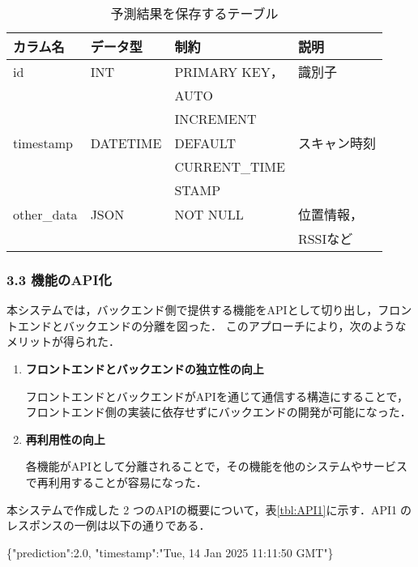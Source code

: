 \begin{table}[tb]
	\centering
	\caption{予測結果を保存するテーブル}
	\label{tbl:prediction_table}
	\small
	\setlength{\tabcolsep}{4pt}
	\doublerulesep=0.3pt
	\begin{tabular}{l|l|l|l} \hline\hline\hline
		カラム名 & データ型 & 制約 & 説明 \\ \hline
		id & INT & PRIMARY KEY， &  識別子 \\
		&&AUTO& \\
		&&INCREMENT& \\ \hline
		timestamp & DATETIME & DEFAULT  & スキャン時刻 \\
		&&CURRENT\_TIME& \\
		&&STAMP& \\ \hline
		other\_data & JSON & NOT NULL & 位置情報，\\
		&&&RSSIなど \\ \hline\hline\hline
	\end{tabular}
\end{table}

\subsubsection*{3.3 機能のAPI化}
本システムでは，バックエンド側で提供する機能をAPIとして切り出し，フロントエンドとバックエンドの分離を図った．
このアプローチにより，次のようなメリットが得られた．

\begin{enumerate}
	\item {\bfseries フロントエンドとバックエンドの独立性の向上}
	
	フロントエンドとバックエンドがAPIを通じて通信する構造にすることで，フロントエンド側の実装に依存せずにバックエンドの開発が可能になった．
	
	\item {\bfseries 再利用性の向上}
	 
	各機能がAPIとして分離されることで，その機能を他のシステムやサービスで再利用することが容易になった．
	
\end{enumerate}

本システムで作成した 2 つのAPIの概要について，表\ref{tbl:API1}に示す．API\textcircled{1}のレスポンスの一例は以下の通りである．

\begin{minipage}{.45\textwidth}
	\begin{screen}
		\ttfamily
		\{"prediction":2.0, \newline"timestamp":"Tue, 14 Jan 2025 11:11:50 GMT"\}
	\end{screen}			
\end{minipage}

